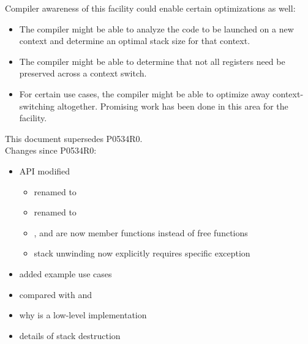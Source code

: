 \documentclass[fontsize=10pt,paper=A4,pagesize,DIV=15]{scrartcl}
\begin{document}
Compiler awareness of this facility could enable certain optimizations as
well:

\begin{itemize}
  \item The compiler might be able to analyze the code to be launched on a new
    \cc context and determine an optimal stack size for that context.
  \item The compiler might be able to determine that not all registers need be
    preserved across a context switch.
  \item For certain use cases, the compiler might be able to optimize away
    context-switching altogether. Promising work has been done in this area
    for the \coawait facility.\cite{N4649}
\end{itemize}

This document supersedes P0534R0.\cite{P0534R0}\\
\newline
Changes since P0534R0:

\begin{itemize}
    \item API modified
    \begin{itemize}
        \item {} renamed to \resume
        \item {} renamed to \resumewith
        \item \dataavail, \getdata and \anythread are now member functions
          instead of free functions
        \item stack unwinding now explicitly requires specific  
              exception
    \end{itemize}
    \item added example use cases
    \item \cc compared with \uc and \lj
    \item why \cc is a low-level implementation
    \item details of stack destruction
\end{itemize}














\end{document}
